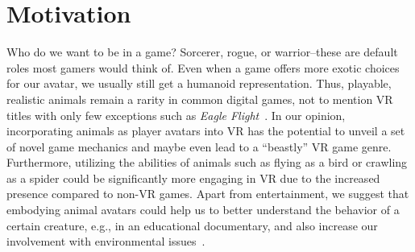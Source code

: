 \documentclass[conference]{IEEEtran}
\begin{document}
%
%

\section{Motivation}
\label{section:application}





Who do we want to be in a game? Sorcerer, rogue, or warrior--these are default roles most gamers would think of. Even when a game offers more exotic choices for our avatar, we usually still get a humanoid representation. Thus, playable, realistic animals remain a rarity in common digital games, not to mention VR titles with only few exceptions such as \textit{Eagle Flight}~\cite{Eagle}. In our opinion, incorporating animals as player avatars into VR has the potential to unveil a set of novel game mechanics and maybe even lead to a ``beastly'' VR game genre. Furthermore, utilizing the abilities of animals such as flying as a bird or crawling as a spider could be significantly more engaging in VR due to the increased presence compared to non-VR games. Apart from entertainment, we suggest that embodying animal avatars could help us to better understand the behavior of a certain creature, e.g., in an educational documentary, and also increase our involvement with environmental issues~\cite{ahn2016experiencing}.
\end{document}
